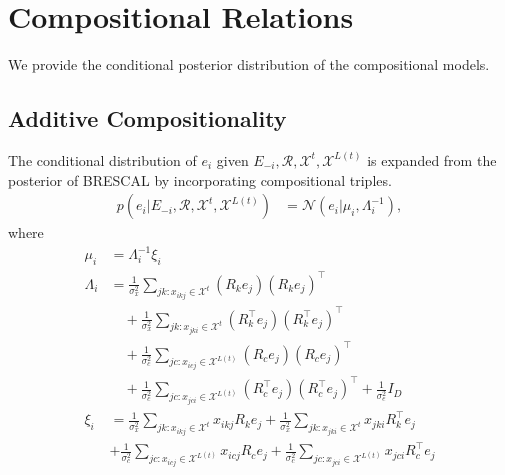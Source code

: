 \section{Compositional Relations}

We provide the conditional posterior distribution of the compositional models.

\subsection{Additive Compositionality}

The conditional distribution of $e_i$ given $E_{-i}, \mathcal{R}, \mathcal{X}^{t}, \mathcal{X}^{L(t)}$ is
expanded from the posterior of BRESCAL by incorporating compositional triples.
\begin{align} \label{eqn:comp_sample_e}
p(e_i |E_{-i}, \mathcal{R}, \mathcal{X}^{t}, \mathcal{X}^{L(t)}) &= \mathcal{N}(e_i | \mu_i, \Lambda_i^{-1}),
\end{align}
where
\begin{align*}
\mu_i &= \Lambda_i^{-1}\xi_i \\
\Lambda_i &= \frac{1}{\sigma_x^2} \sum_{jk : x_{ikj} \in \mathcal{X}^{t}} (R_k e_j)(R_k e_j)^\top \\
&\quad+ \frac{1}{\sigma_x^2} \sum_{jk : x_{jki} \in \mathcal{X}^{t}} (R_k^\top e_j)(R_k^\top e_j)^\top \\
&\quad + \frac{1}{\sigma_c^2} \sum_{jc : x_{icj} \in \mathcal{X}^{L(t)}} (R_c e_j)(R_c e_j)^\top \\
&\quad+ \frac{1}{\sigma_c^2} \sum_{jc : x_{jci} \in \mathcal{X}^{L(t)}} (R_c^\top e_j)(R_c^\top e_j)^\top +
\frac{1}{\sigma_e^2} {I}_D \\
\xi_i &= \frac{1}{\sigma_x^2}\sum_{jk : x_{ikj} \in \mathcal{X}^{t}}  x_{ikj} R_{k} e_{j} + \frac{1}
{\sigma_x^2}\sum_{jk : x_{jki} \in \mathcal{X}^{t}} x_{jki} R_{k}^\top e_{j} \\
& + \frac{1}{\sigma_c^2}\sum_{jc : x_{icj} \in \mathcal{X}^{L(t)}}  x_{icj} R_{c} e_{j} + \frac{1}
{\sigma_c^2}\sum_{jc : x_{jci} \in \mathcal{X}^{L(t)}} x_{jci} R_{c}^\top e_{j}
\end{align*}

